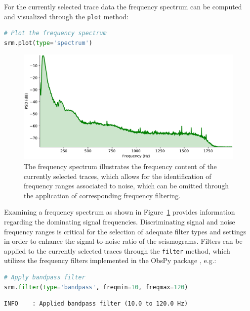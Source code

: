 \documentclass[a4paper,fleqn]{cas-sc}
\begin{document}
For the currently selected trace data the frequency spectrum can be computed and visualized through the \texttt{plot} method:
\begin{lstlisting}[language=Python, firstnumber=12]
# Plot the frequency spectrum
srm.plot(type='spectrum')
\end{lstlisting}
\begin{figure}
	\centering
	\includegraphics[width=.75\textwidth]{figures/spectrum.pdf}
	\caption{The frequency spectrum illustrates the frequency content of the currently selected traces, which allows for the identification of frequency ranges associated to noise, which can be omitted through the application of corresponding frequency filtering.}
	\label{fig:spectrum}
\end{figure}
Examining a frequency spectrum as shown in Figure~\ref{fig:spectrum} provides information regarding the dominating signal frequencies. Discriminating signal and noise frequency ranges is critical for the selection of adequate filter types and settings in order to enhance the signal-to-noise ratio of the seismograms. 
Filters can be applied to the currently selected traces 
through the \texttt{filter} method, which utilizes the frequency filters implemented in the ObsPy package \citep[lowpass, highpass, bandpass and bandstop;][]{beyreuther2010}, e.g.:
\begin{lstlisting}[language=Python, firstnumber=14]
# Apply bandpass filter
srm.filter(type='bandpass', freqmin=10, freqmax=120)
\end{lstlisting}
\begin{footnotesize}
\begin{verbatim}
INFO    : Applied bandpass filter (10.0 to 120.0 Hz)
\end{verbatim}
\end{footnotesize}
\end{document}
